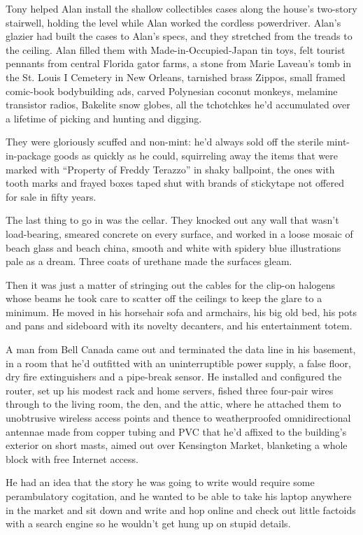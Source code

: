 Tony helped Alan install the shallow collectibles cases along the
house's two-story stairwell, holding the level while Alan worked the
cordless powerdriver.  Alan's glazier had built the cases to Alan's
specs, and they stretched from the treads to the ceiling.  Alan filled
them with Made-in-Occupied-Japan tin toys, felt tourist pennants from
central Florida gator farms, a stone from Marie Laveau's tomb in the
St.  Louis I Cemetery in New Orleans, tarnished brass Zippos, small
framed comic-book bodybuilding ads, carved Polynesian coconut monkeys,
melamine transistor radios, Bakelite snow globes, all the tchotchkes
he'd accumulated over a lifetime of picking and hunting and digging.

They were gloriously scuffed and non-mint:  he'd always sold off the
sterile mint-in-package goods as quickly as he could, squirreling away
the items that were marked with ``Property of Freddy Terazzo'' in
shaky ballpoint, the ones with tooth marks and frayed boxes taped shut
with brands of stickytape not offered for sale in fifty years.

The last thing to go in was the cellar.  They knocked out any wall
that wasn't load-bearing, smeared concrete on every surface, and
worked in a loose mosaic of beach glass and beach china, smooth and
white with spidery blue illustrations pale as a dream.  Three coats of
urethane made the surfaces gleam.

Then it was just a matter of stringing out the cables for the clip-on
halogens whose beams he took care to scatter off the ceilings to keep
the glare to a minimum.  He moved in his horsehair sofa and armchairs,
his big old bed, his pots and pans and sideboard with its novelty
decanters, and his entertainment totem.

A man from Bell Canada came out and terminated the data line in his
basement, in a room that he'd outfitted with an uninterruptible power
supply, a false floor, dry fire extinguishers and a pipe-break sensor. 
He installed and configured the router, set up his modest rack and
home servers, fished three four-pair wires through to the living room,
the den, and the attic, where he attached them to unobtrusive wireless
access points and thence to weatherproofed omnidirectional antennae
made from copper tubing and PVC that he'd affixed to the building's
exterior on short masts, aimed out over Kensington Market, blanketing
a whole block with free Internet access.

He had an idea that the story he was going to write would require some
perambulatory cogitation, and he wanted to be able to take his laptop
anywhere in the market and sit down and write and hop online and check
out little factoids with a search engine so he wouldn't get hung up on
stupid details.


